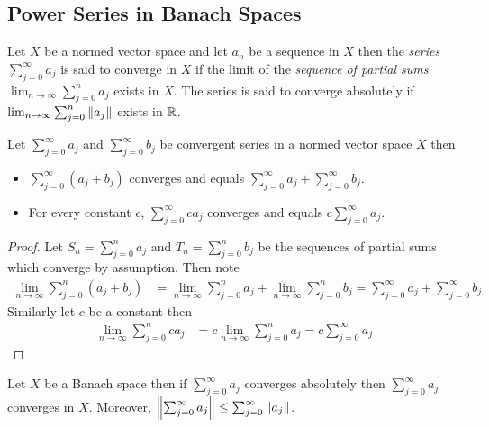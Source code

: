 \subsection{Power Series in Banach Spaces}

\begin{defn}Let $X$ be a normed vector space and let $a_n$ be a
  sequence in $X$ then the \emph{series} $\sum_{j=0}^{\infty} a_j$ is
  said to converge in $X$ if the limit of the \emph{sequence of partial sums}
  $\lim_{n \to \infty} \sum_{j=0}^n a_j$ exists in $X$.   The
  series is said to converge absolutely if $\lim_{n \to \infty}
  \sum_{j=0}^n \left \lVert a_j \right \rVert$ exists in $\mathbb{R}$.
\end{defn}

\begin{prop}Let $\sum_{j=0}^\infty a_j$ and  $\sum_{j=0}^\infty b_j$
  be convergent series in a normed vector space $X$ then
  \begin{itemize}
    \item[(i)] $\sum_{j=0}^\infty \left(a_j + b_j \right)$ converges
      and equals $\sum_{j=0}^\infty a_j + \sum_{j=0}^\infty b_j$.
    \item[(ii)] For every constant $c$, $\sum_{j=0}^\infty ca_j$ converges
      and equals $c\sum_{j=0}^\infty a_j $.
  \end{itemize}
\end{prop}
\begin{proof}
Let $S_n = \sum_{j=0}^n a_j$ and $T_n = \sum_{j=0}^n b_j$ be the
sequences of partial sums which converge by assumption.   Then note
\begin{align*}
  \lim_{n \to \infty} \sum_{j=0}^n \left( a_j + b_j \right)
  &= \lim_{n \to \infty} \sum_{j=0}^n a_j + \lim_{n \to \infty}  \sum_{j=0}^n b_j 
  = \sum_{j=0}^\infty a_j + \sum_{j=0}^\infty b_j
\end{align*}
Similarly let $c$ be a constant then 
\begin{align*}
  \lim_{n \to \infty} \sum_{j=0}^n c a_j
  &= c \lim_{n \to \infty} \sum_{j=0}^n a_j
  = c \sum_{j=0}^\infty a_j
\end{align*}
\end{proof}
\begin{prop}\label{banach:AbsoluteConvergenceOfSeriesImpliesConvergence}Let $X$ be a Banach space then if $\sum_{j=0}^\infty a_j$
  converges absolutely then $\sum_{j=0}^\infty a_j$ converges in $X$.
  Moreover, $\left \lVert \sum_{j=0}^\infty a_j \right \rVert \leq \sum_{j=0}^\infty \left \lVert a_j \right \rVert$.
\end{prop}
